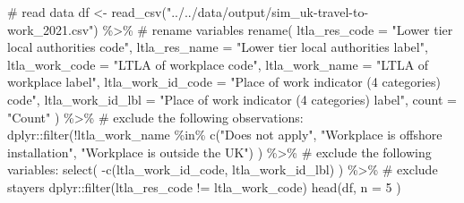 \documentclass[
  a4paper, 
  twoside,
  final
]{article}
\newenvironment{Shaded}{\begin{snugshade}}{\end{snugshade}}
\newcommand{\AttributeTok}[1]{\textcolor[rgb]{0.40,0.45,0.13}{#1}}
\newcommand{\CommentTok}[1]{\textcolor[rgb]{0.37,0.37,0.37}{#1}}
\newcommand{\DecValTok}[1]{\textcolor[rgb]{0.68,0.00,0.00}{#1}}
\newcommand{\FunctionTok}[1]{\textcolor[rgb]{0.28,0.35,0.67}{#1}}
\newcommand{\NormalTok}[1]{\textcolor[rgb]{0.00,0.23,0.31}{#1}}
\newcommand{\OtherTok}[1]{\textcolor[rgb]{0.00,0.23,0.31}{#1}}
\newcommand{\SpecialCharTok}[1]{\textcolor[rgb]{0.37,0.37,0.37}{#1}}
\newcommand{\StringTok}[1]{\textcolor[rgb]{0.13,0.47,0.30}{#1}}
\newcounter{code}
\begin{document}
\begin{Shaded}
\begin{Highlighting}[]
\CommentTok{\# read data}
\NormalTok{df }\OtherTok{\textless{}{-}} \FunctionTok{read\_csv}\NormalTok{(}\StringTok{"../../data/output/sim\_uk{-}travel{-}to{-}work\_2021.csv"}\NormalTok{) }\SpecialCharTok{\%\textgreater{}\%} 
  \CommentTok{\# rename variables}
  \FunctionTok{rename}\NormalTok{(}
    \AttributeTok{ltla\_res\_code =} \StringTok{"Lower tier local authorities code"}\NormalTok{,}
    \AttributeTok{ltla\_res\_name =} \StringTok{"Lower tier local authorities label"}\NormalTok{,}
    \AttributeTok{ltla\_work\_code =} \StringTok{"LTLA of workplace code"}\NormalTok{,}
    \AttributeTok{ltla\_work\_name =} \StringTok{"LTLA of workplace label"}\NormalTok{,}
    \AttributeTok{ltla\_work\_id\_code =} \StringTok{"Place of work indicator (4 categories) code"}\NormalTok{,}
    \AttributeTok{ltla\_work\_id\_lbl =} \StringTok{"Place of work indicator (4 categories) label"}\NormalTok{,}
    \AttributeTok{count =} \StringTok{"Count"}
\NormalTok{  ) }\SpecialCharTok{\%\textgreater{}\%} 
  \CommentTok{\# exclude the following observations:}
\NormalTok{  dplyr}\SpecialCharTok{::}\FunctionTok{filter}\NormalTok{(}\SpecialCharTok{!}\NormalTok{ltla\_work\_name }\SpecialCharTok{\%in\%} 
                  \FunctionTok{c}\NormalTok{(}\StringTok{"Does not apply"}\NormalTok{, }
                    \StringTok{"Workplace is offshore installation"}\NormalTok{, }
                    \StringTok{"Workplace is outside the UK"}\NormalTok{) ) }\SpecialCharTok{\%\textgreater{}\%} 
  \CommentTok{\# exclude the following variables:}
  \FunctionTok{select}\NormalTok{( }\SpecialCharTok{{-}}\FunctionTok{c}\NormalTok{(ltla\_work\_id\_code, ltla\_work\_id\_lbl) ) }\SpecialCharTok{\%\textgreater{}\%} 
  \CommentTok{\# exclude stayers}
\NormalTok{  dplyr}\SpecialCharTok{::}\FunctionTok{filter}\NormalTok{(ltla\_res\_code }\SpecialCharTok{!=}\NormalTok{ ltla\_work\_code) }
\FunctionTok{head}\NormalTok{(df, }\AttributeTok{n =} \DecValTok{5}\NormalTok{ ) }
\end{Highlighting}
\end{Shaded}
\end{document}
